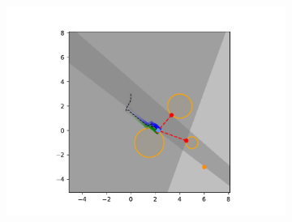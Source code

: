 \begin{figure}[h]
\begin{subfigure}{0.20\textwidth}
        \includegraphics[width=\textwidth]{figures/Simulations/sim1circles/frame_4.pdf}
    \end{subfigure}
    

\end{figure}
